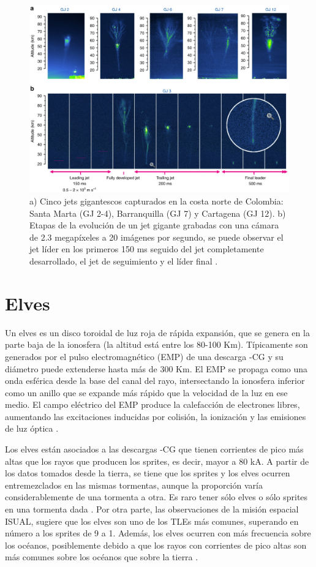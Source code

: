 \documentclass[12pt,oneside,openany,letter]{book}
\begin{document}
\begin{figure}
    \centering
    \includegraphics[scale=0.45]{figures/gigantic_jets_colombia.png}
    \caption[Jets gigantescos capturados en la costa norte de Colombia]{a) Cinco jets gigantescos capturados en la costa norte de Colombia: Santa Marta (GJ 2-4), Barranquilla (GJ 7) y Cartagena (GJ 12). b) Etapas de la evolución de un jet gigante grabadas con una cámara de 2.3 megapíxeles a 20 imágenes por segundo, se puede observar el jet líder en los primeros 150 ms seguido del jet completamente desarrollado, el jet de seguimiento y el líder final \cite{VanEtal2019}.}
    \label{fig:gigantic_jets_colombia}
\end{figure}

\section{Elves}
Un elves es un disco toroidal de luz roja de rápida expansión, que se genera en la parte baja de la ionosfera (la altitud está entre los 80-100 Km). Típicamente son generados por el pulso electromagnético (EMP) de una descarga -CG y su diámetro puede extenderse hasta más de 300 Km. El EMP se propaga como una onda esférica desde la base del canal del rayo, intersectando la ionosfera inferior como un anillo que se expande más rápido que la velocidad de la luz en ese medio. El campo eléctrico del EMP produce la calefacción de electrones libres, aumentando las excitaciones inducidas por colisión, la ionización y las emisiones de luz óptica \cite{FullekrugEtal2006}.

Los elves están asociados a las descargas -CG que tienen corrientes de pico más altas que los rayos que producen los sprites, es decir, mayor a 80 kA. A partir de los datos tomados desde la tierra, se tiene que los sprites y los elves ocurren entremezclados en las mismas tormentas, aunque la proporción varía considerablemente de una tormenta a otra. Es raro tener sólo elves o sólo sprites en una tormenta dada \cite{FullekrugEtal2006}. Por otra parte, las observaciones de la misi\'on espacial ISUAL, sugiere que los elves son uno de los TLEs más comunes, superando en número a los sprites de 9 a 1. Además, los elves ocurren con más frecuencia sobre los océanos, posiblemente debido a que los rayos con corrientes de pico altas son más comunes sobre los océanos que sobre la tierra \cite{DwyerUman2014}. 
\end{document}
